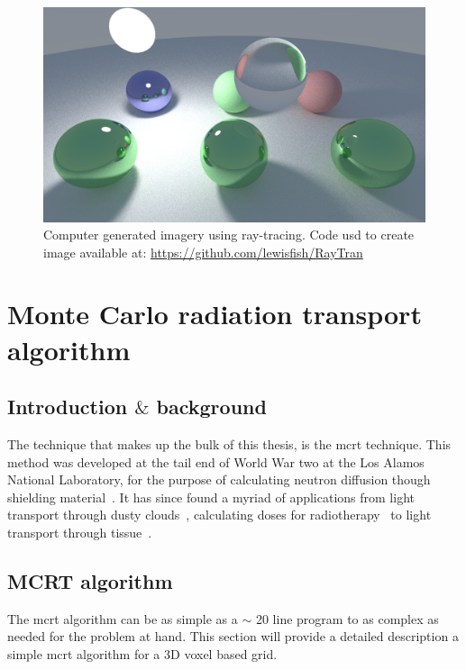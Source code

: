 \begin{figure}
\centering
\includegraphics[width=\columnwidth]{./MCRT/images/ray-tracing.png}
\caption{Computer generated imagery using ray-tracing. Code usd to create image available at: \url{https://github.com/lewisfish/RayTran}}
\label{fig:ray-trace}
\end{figure}

\section{Monte Carlo radiation transport algorithm}

\subsection{Introduction $\&$ background}
The technique that makes up the bulk of this thesis, is the \gls{mcrt} technique. This method was developed at the tail end of World War two at the Los Alamos National Laboratory, for the purpose of calculating neutron diffusion though shielding material~\cite{montybeg1,eckhardt1987stan,anderson1986metropolis,ulam1947statistical}. It has since found a myriad of applications from light transport through dusty clouds~\cite{wood1999model}, calculating doses for radiotherapy~\cite{rogers1995beam} to light transport through tissue~\cite{1stmonty}.

\subsection{MCRT algorithm}

The \gls{mcrt} algorithm can be as simple as a $\sim$ 20 line program to as complex as needed for the problem at hand. This section will provide a detailed description a simple \gls{mcrt} algorithm for a 3D voxel based grid.

